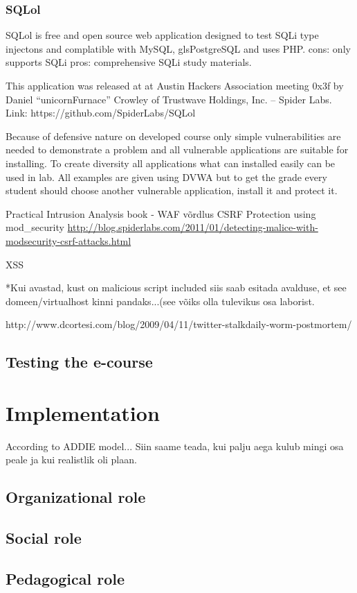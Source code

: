 \subsubsection{SQLol}
SQLol is free and open source web application designed to test \gls{SQLi} type injectons and complatible with \gls{MySQL}, gls{PostgreSQL} and uses \gls{PHP}.
cons: only supports \gls{SQLi}
pros: comprehensive  \gls{SQLi} study materials.

 This application was released at at Austin Hackers Association meeting 0x3f by Daniel “unicornFurnace” Crowley of Trustwave Holdings, Inc. – Spider Labs.
Link: https://github.com/SpiderLabs/SQLol



Because of defensive nature on developed course only simple vulnerabilities are needed to demonstrate a problem and all vulnerable applications are suitable for installing. To create diversity all applications what can installed easily can be used in lab. All examples are given using \gls{DVWA} but to get the grade every student should choose another vulnerable application, install it and protect it.

Practical Intrusion Analysis book - WAF võrdlus \citep{book:practica_intrusion_analysis}
\gls{CSRF}
Protection using mod\_security
\url{http://blog.spiderlabs.com/2011/01/detecting-malice-with-modsecurity-csrf-attacks.html}

\gls{XSS}
{
\color{red} *Kui avastad, kust on malicious script included siis saab esitada avalduse, et see domeen/virtualhost kinni pandaks...(see võiks olla tulevikus osa laborist.

http://www.dcortesi.com/blog/2009/04/11/twitter-stalkdaily-worm-postmortem/
}





\subsection{Testing the e-course}

\section{Implementation}
According to \gls{ADDIE} model...
Siin saame teada, kui palju aega kulub mingi osa peale ja kui realistlik oli plaan.

\subsection{Organizational role}

\subsection{Social role}

\subsection{Pedagogical role}
